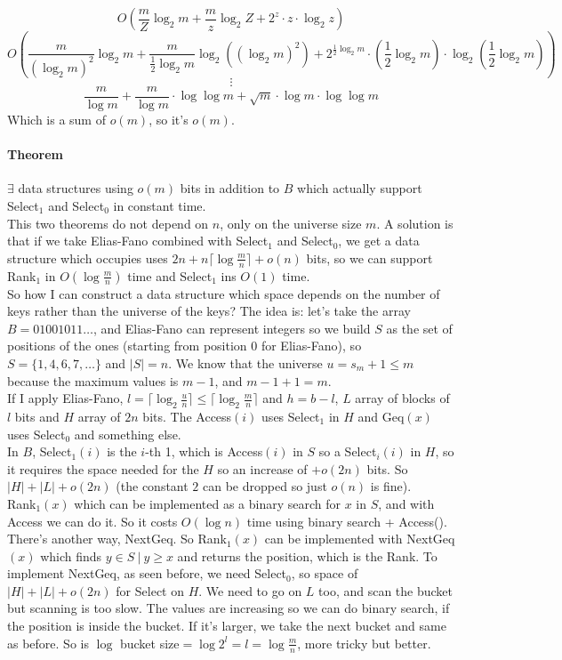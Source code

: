 \documentclass[10pt]{report}
\begin{document}
$$O\left(\frac{m}{Z}\log_2 m + \frac{m}{z}\log_2 Z + 2^z\cdot z\cdot\log_2 z\right)$$
$$O\left(\frac{m}{(\log_2 m)^2}\log_2 m + \frac{m}{\frac{1}{2}\log_2 m}\log_2 ((\log_2 m)^2) + 2^{\frac{1}{2}\log_2 m}\cdot (\frac{1}{2}\log_2 m)\cdot\log_2 (\frac{1}{2}\log_2 m)\right)$$
$$\vdots$$
$$\frac{m}{\log m}+\frac{m}{\log m}\cdot\log\log m + \sqrt{m}\cdot\log m\cdot\log\log m$$
Which is a sum of $o(m)$, so it's $o(m)$.
\paragraph{Theorem} $\exists$ data structures using $o(m)$ bits in addition to $B$ which actually support Select$_1$ and Select$_0$ in constant time.\\
This two theorems do not depend on $n$, only on the universe size $m$. A solution is that if we take Elias-Fano combined with Select$_1$ and Select$_0$, we get a data structure which occupies uses $2n + n \lceil \log \frac{m}{n}\rceil+o(n)$ bits, so we can support Rank$_1$ in $O(\log\frac{m}{n})$ time and Select$_1$ ins $O(1)$ time.\\
So how I can construct a data structure which space depends on the number of keys rather than the universe of the keys? The idea is: let's take the array $B = 01001011\ldots$, and Elias-Fano can represent integers so we build $S$ as the set of positions of the ones (starting from position $0$ for Elias-Fano), so $S=\{1,4,6,7,\ldots\}$ and $|S|=n$. We know that the universe $u = s_m + 1 \leq m$ because the maximum values is $m-1$, and $m-1+1=m$.\\
If I apply Elias-Fano, $l=\lceil\log_2\frac{u}{n}\rceil \leq \lceil\log_2\frac{m}{n}\rceil$ and $h = b - l$, $L$ array of blocks of $l$ bits and $H$ array of $2n$ bits. The Access$(i)$ uses Select$_1$ in $H$ and Geq$(x)$ uses Select$_0$ and something else.\\
In $B$, Select$_1(i)$ is the $i$-th 1, which is Access$(i)$ in $S$ so a Select$_i(i)$ in $H$, so it requires the space needed for the $H$ so an increase of $+o(2n)$ bits. So $|H|+|L| + o(2n)$ (the constant $2$ can be dropped so just $o(n)$ is fine).\\
Rank$_1(x)$ which can be implemented as a binary search for $x$ in $S$, and with Access we can do it. So it costs $O(\log n)$ time using binary search + Access(). There's another way, NextGeq. So Rank$_1(x)$ can be implemented with NextGeq$(x)$ which finds $y\in S\:|\:y\geq x$ and returns the position, which is the Rank. To implement NextGeq, as seen before, we need Select$_0$, so space of $|H|+|L|+o(2n)$ for Select on $H$. We need to go on $L$ too, and scan the bucket but scanning is too slow. The values are increasing so we can do binary search, if the position is inside the bucket. If it's larger, we take the next bucket and same as before. So is $\log$ bucket size$=\log 2^l = l = \log\frac{m}{n}$, more tricky but better.
\end{document}
